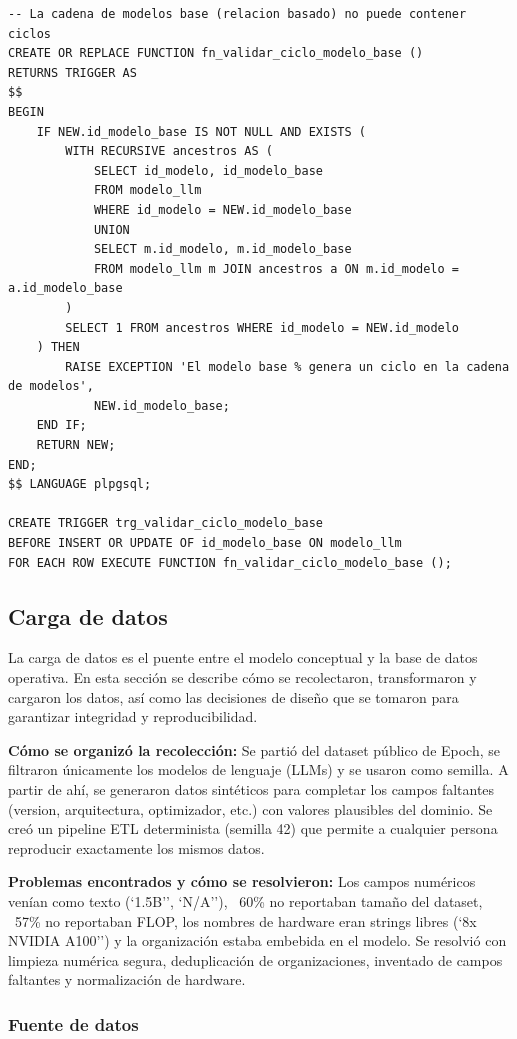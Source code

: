\documentclass[12pt,a4paper]{article}
\begin{document}
\begin{lstlisting}
-- La cadena de modelos base (relacion basado) no puede contener ciclos
CREATE OR REPLACE FUNCTION fn_validar_ciclo_modelo_base ()
RETURNS TRIGGER AS
$$
BEGIN
    IF NEW.id_modelo_base IS NOT NULL AND EXISTS (
        WITH RECURSIVE ancestros AS (
            SELECT id_modelo, id_modelo_base
            FROM modelo_llm
            WHERE id_modelo = NEW.id_modelo_base
            UNION
            SELECT m.id_modelo, m.id_modelo_base
            FROM modelo_llm m JOIN ancestros a ON m.id_modelo = a.id_modelo_base
        )
        SELECT 1 FROM ancestros WHERE id_modelo = NEW.id_modelo
    ) THEN
        RAISE EXCEPTION 'El modelo base % genera un ciclo en la cadena de modelos',
            NEW.id_modelo_base;
    END IF;
    RETURN NEW;
END;
$$ LANGUAGE plpgsql;

CREATE TRIGGER trg_validar_ciclo_modelo_base
BEFORE INSERT OR UPDATE OF id_modelo_base ON modelo_llm
FOR EACH ROW EXECUTE FUNCTION fn_validar_ciclo_modelo_base ();
\end{lstlisting}

\subsection{Carga de datos}

La carga de datos es el puente entre el modelo conceptual y la base de datos operativa. En esta sección se describe cómo se recolectaron, transformaron y cargaron los datos, así como las decisiones de diseño que se tomaron para garantizar integridad y reproducibilidad.

\textbf{Cómo se organizó la recolección:} Se partió del dataset público de Epoch, se filtraron únicamente los modelos de lenguaje (LLMs) y se usaron como semilla. A partir de ahí, se generaron datos sintéticos para completar los campos faltantes (version, arquitectura, optimizador, etc.) con valores plausibles del dominio. Se creó un pipeline ETL determinista (semilla 42) que permite a cualquier persona reproducir exactamente los mismos datos.

\textbf{Problemas encontrados y cómo se resolvieron:} Los campos numéricos venían como texto (`1.5B'', `N/A''), ~60\% no reportaban tamaño del dataset, ~57\% no reportaban FLOP, los nombres de hardware eran strings libres (`8x NVIDIA A100'') y la organización estaba embebida en el modelo. Se resolvió con limpieza numérica segura, deduplicación de organizaciones, inventado de campos faltantes y normalización de hardware.

\subsubsection{Fuente de datos}
\end{document}
